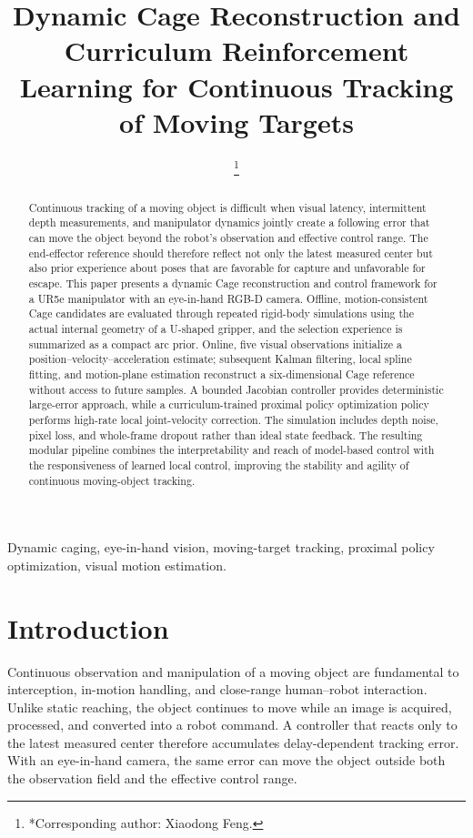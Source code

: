 \documentclass[conference]{IEEEtran}
\title{Dynamic Cage Reconstruction and Curriculum Reinforcement Learning for Continuous Tracking of Moving Targets}
\author{
\IEEEauthorblockN{Jiarun Shi and Xiaodong Feng*}
\IEEEauthorblockA{
School of Information Science and Technology\\
Beijing University of Chemical Technology, Beijing, China\\
\{2023030094, 2002500022\}@buct.edu.cn}
\thanks{*Corresponding author: Xiaodong Feng.}
}
\begin{document}
\maketitle

\begin{abstract}
Continuous tracking of a moving object is difficult when visual latency, intermittent depth measurements, and manipulator dynamics jointly create a following error that can move the object beyond the robot's observation and effective control range. The end-effector reference should therefore reflect not only the latest measured center but also prior experience about poses that are favorable for capture and unfavorable for escape. This paper presents a dynamic Cage reconstruction and control framework for a UR5e manipulator with an eye-in-hand RGB-D camera. Offline, motion-consistent Cage candidates are evaluated through repeated rigid-body simulations using the actual internal geometry of a U-shaped gripper, and the selection experience is summarized as a compact arc prior. Online, five visual observations initialize a position--velocity--acceleration estimate; subsequent Kalman filtering, local spline fitting, and motion-plane estimation reconstruct a six-dimensional Cage reference without access to future samples. A bounded Jacobian controller provides deterministic large-error approach, while a curriculum-trained proximal policy optimization policy performs high-rate local joint-velocity correction. The simulation includes depth noise, pixel loss, and whole-frame dropout rather than ideal state feedback. The resulting modular pipeline combines the interpretability and reach of model-based control with the responsiveness of learned local control, improving the stability and agility of continuous moving-object tracking.
\end{abstract}

\begin{IEEEkeywords}
Dynamic caging, eye-in-hand vision, moving-target tracking, proximal policy optimization, visual motion estimation.
\end{IEEEkeywords}

\section{Introduction}

Continuous observation and manipulation of a moving object are fundamental to interception, in-motion handling, and close-range human--robot interaction. Unlike static reaching, the object continues to move while an image is acquired, processed, and converted into a robot command. A controller that reacts only to the latest measured center therefore accumulates delay-dependent tracking error. With an eye-in-hand camera, the same error can move the object outside both the observation field and the effective control range.
\end{document}
